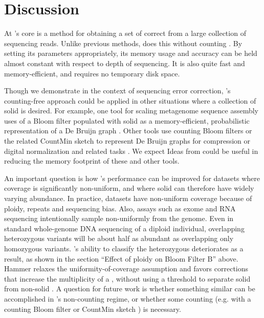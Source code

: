 \documentclass{bmcart}
\begin{document}
\section*{Discussion}
At \tool's core is a method for obtaining a set of correct \kmers from a large collection of sequencing reads.
Unlike previous methods, \tool does this without counting \kmers.
By setting its parameters appropriately, its memory usage and accuracy can be held almost constant with respect to depth of sequencing.
It is also quite fast and memory-efficient, and requires no temporary disk space.

Though we demonstrate \tool in the context of sequencing error correction, \tool's counting-free approach could be applied in other situations where a collection of solid \kmers is desired.
For example, one tool for scaling metagenome sequence assembly uses of a Bloom filter populated with solid \kmers as a memory-efficient, probabilistic representation of a De Bruijn graph \cite{pell2012scaling}.
Other tools use counting Bloom filters \cite{fan2000summary, bonomi2006improved} or the related CountMin sketch \cite{cormode2005improved} to represent De Bruijn graphs for compression \cite{jones2012compression} or digital normalization and related tasks \cite{zhang2013these}.
We expect Ideas from \tool could be useful in reducing the memory footprint of these and other tools.

An important question is how \tool's performance can be improved for datasets where coverage is significantly non-uniform, and where solid \kmers can therefore have widely varying abundance.
In practice, datasets have non-uniform coverage because of ploidy, repeats and sequencing bias.
Also, assays such as exome and RNA sequencing intentionally sample non-uniformly from the genome.
Even in standard whole-genome DNA sequencing of a diploid individual, \kmers overlapping heterozygous variants will be about half as abundant as \kmers overlapping only homozygous variants.
\tool's ability to classify the heterozygous \kmers deteriorates as a result, as shown in the section ``Effect of ploidy on Bloom Filter B'' above.
Hammer \cite{medvedev2011error} relaxes the uniformity-of-coverage assumption and favors corrections that increase the multiplicity of a \kmer, without using a threshold to separate solid from non-solid \kmers.
A question for future work is whether something similar can be accomplished in \tool's non-counting regime, or whether some counting (e.g. with a counting Bloom filter \cite{fan2000summary, bonomi2006improved} or CountMin sketch \cite{cormode2005improved}) is necessary.
\end{document}
